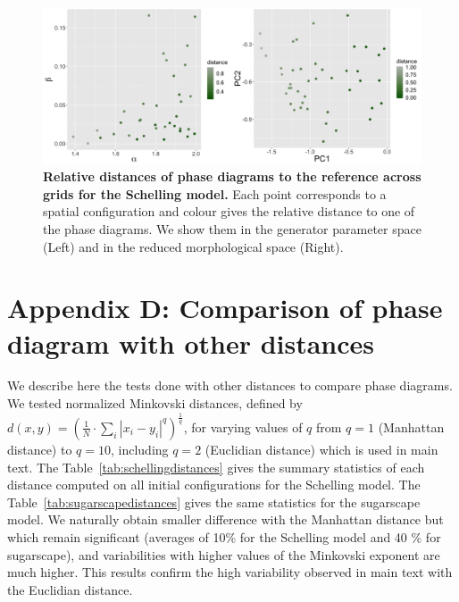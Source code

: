 \documentclass{JASSS}
\begin{document}
\begin{figure}[!t]
\centering
\includegraphics[width=\textwidth]{figures/Fig8.png}
\caption{\textbf{Relative distances of phase diagrams to the reference across grids for the Schelling model.} Each point corresponds to a spatial configuration and colour gives the relative distance to one of the phase diagrams. We show them in the generator parameter space (Left) and in the reduced morphological space (Right).\label{fig:schelling-distance-meta}}
\end{figure}


\section{Appendix D: Comparison of phase diagram with other distances}

\label{app:distances}

We describe here the tests done with other distances to compare phase diagrams. We tested normalized Minkovski distances, defined by $d(x,y) = \left(\frac{1}{N}\cdot \sum_i \left|x_i - y_i\right|^{q}\right)^{\frac{1}{q}}$, for varying values of $q$ from $q = 1$ (Manhattan distance) to $q = 10$, including $q = 2$ (Euclidian distance) which is used in main text. The Table~\ref{tab:schellingdistances} gives the summary statistics of each distance computed on all initial configurations for the Schelling model. The Table~\ref{tab:sugarscapedistances} gives the same statistics for the sugarscape model. We naturally obtain smaller difference with the Manhattan distance but which remain significant (averages of 10\% for the Schelling model and 40 \% for sugarscape), and variabilities with higher values of the Minkovski exponent are much higher. This results confirm the high variability observed in main text with the Euclidian distance.
\end{document}
